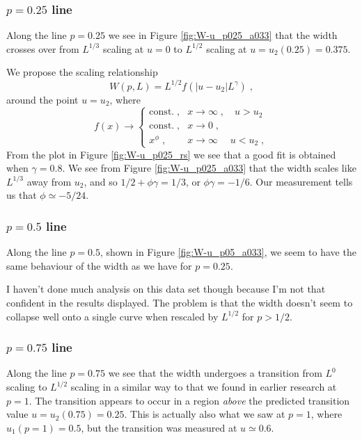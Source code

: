 \documentclass[a4paper,10pt]{article}
\newcommand{\fref}[1]{Figure \ref{#1}}
\begin{document}
\subsubsection{$p=0.25$ line}

Along the line $p=0.25$ we see in \fref{fig:W-u_p025_a033} that the width crosses over from $L^{1/3}$ scaling at $u=0$ to $L^{1/2}$ scaling at $u = u_2(0.25) = 0.375$.

We propose the scaling relationship
\begin{equation}
 W(p,L) = L^{1/2} f(|u-u_2| L^\gamma) \;,
\end{equation}
around the point $u=u_2$, where
\begin{equation}
 f(x) \to \begin{cases}
              \mbox{const.} \;, & x\to \infty \;, \quad u > u_2 \; \\
              \mbox{const.} \;, & x \to 0 \;, \\
              x^\phi \;, & x\to \infty \; \quad u < u_2 \;,
             \end{cases}
\end{equation}
From the plot in \fref{fig:W-u_p025_rs} we see that a good fit is obtained when $\gamma = 0.8$. We see from \fref{fig:W-u_p025_a033} that the width scales like $L^{1/3}$ away from $u_2$, and so $1/2 + \phi\gamma = 1/3$, or $\phi\gamma = -1/6$. Our measurement tells us that $\phi \simeq -5/24$.

\subsubsection{$p=0.5$ line}

Along the line $p=0.5$, shown in \fref{fig:W-u_p05_a033}, we seem to have the same behaviour of the width as we have for $p=0.25$. 

I haven't done much analysis on this data set though because I'm not that confident in the results displayed. The problem is that the width doesn't seem to collapse well onto a single curve when rescaled by $L^{1/2}$ for $p>1/2$.

\subsubsection{$p=0.75$ line}

Along the line $p=0.75$ we see that the width undergoes a transition from $L^0$ scaling to $L^{1/2}$ scaling in a similar way to that we found in earlier research at $p=1$. The transition appears to occur in a region \emph{above} the predicted transition value $u = u_2(0.75) = 0.25$. This is actually also what we saw at $p=1$, where $u_1(p=1) = 0.5$, but the transition was measured at $u \simeq0.6$.
\end{document}

